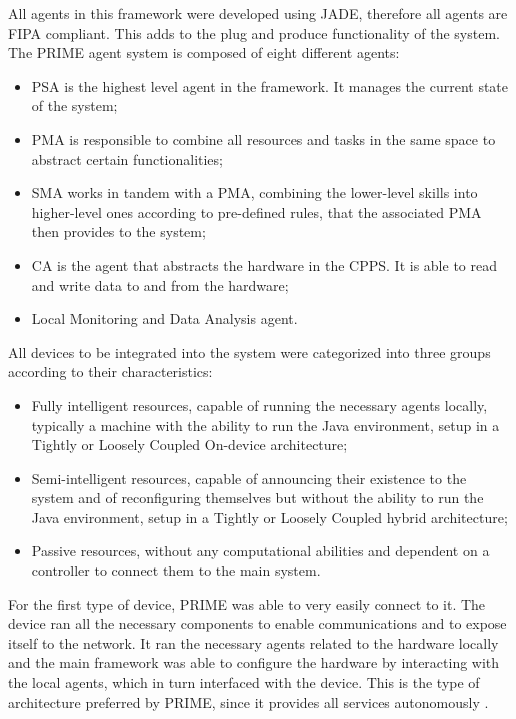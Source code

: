 All agents in this framework were developed using \acrshort{JADE}, therefore all agents are \acrshort{FIPA} compliant. This adds to the plug and produce functionality of the system. The PRIME agent system is composed of eight different agents:
\begin{itemize}
	\itemsep0em
	\item \acrfull{PSA} is the highest level agent in the framework. It manages the current state of the system;
	\item \acrfull{PMA} is responsible to combine all resources and tasks in the same space to abstract certain functionalities;
	\item \acrfull{SMA} works in tandem with a \acrshort{PMA}, combining the lower-level skills into higher-level ones according to pre-defined rules, that the associated \acrshort{PMA} then provides to the system;
	\item \acrfull{CA} is the agent that abstracts the hardware in the \acrshort{CPPS}. It is able to read and write data to and from the hardware;
	\item Local Monitoring and Data Analysis agent.
\end{itemize}

All devices to be integrated into the system were categorized into three groups according to their characteristics:
\begin{itemize}
	\item Fully intelligent resources, capable of running the necessary agents locally, typically a machine with the ability to run the Java environment, setup in a Tightly or Loosely Coupled On-device architecture;
	\item Semi-intelligent resources, capable of announcing their existence to the system and of reconfiguring themselves but without the ability to run the Java environment, setup in a Tightly or Loosely Coupled hybrid architecture;
	\item Passive resources, without any computational abilities and dependent on a controller to connect them to the main system. 
\end{itemize}

For the first type of device, PRIME was able to very easily connect to it. The device ran all the necessary components to enable communications and to expose itself to the network. It ran the necessary agents related to the hardware locally and the main framework was able to configure the hardware by interacting with the local agents, which in turn interfaced with the device. This is the type of architecture preferred by PRIME, since it provides all services autonomously \cite{PRIME_plug_and_produce}.\\

